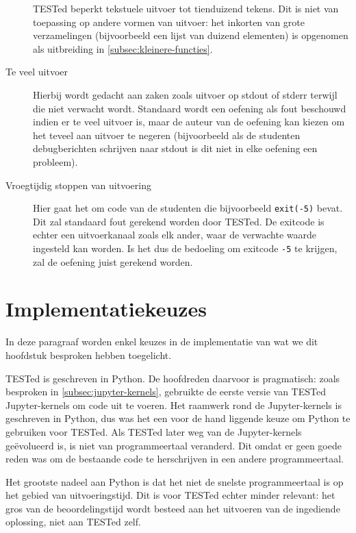 \begin{description}
    TESTed beperkt tekstuele uitvoer tot tienduizend tekens.
    Dit is niet van toepassing op andere vormen van uitvoer: het inkorten van grote verzamelingen (bijvoorbeeld een lijst van duizend elementen) is opgenomen als uitbreiding in \cref{subsec:kleinere-functies}.
    \item[Te veel uitvoer] Hierbij wordt gedacht aan zaken zoals uitvoer op stdout of stderr terwijl die niet verwacht wordt.
    Standaard wordt een oefening als fout beschouwd indien er te veel uitvoer is, maar de auteur van de oefening kan kiezen om het teveel aan uitvoer te negeren (bijvoorbeeld als de studenten debugberichten schrijven naar stdout is dit niet in elke oefening een probleem).
    \item[Vroegtijdig stoppen van uitvoering] Hier gaat het om code van de studenten die bijvoorbeeld \texttt{exit(-5)} bevat.
    Dit zal standaard fout gerekend worden door TESTed.
    De exitcode is echter een uitvoerkanaal zoals elk ander, waar de verwachte waarde ingesteld kan worden.
    Is het dus de bedoeling om exitcode \texttt{-5} te krijgen, zal de oefening juist gerekend worden.

\end{description}

\section{Implementatiekeuzes}\label{sec:technische-aspecten}

In deze paragraaf worden enkel keuzes in de implementatie van wat we dit hoofdstuk besproken hebben toegelicht.

TESTed is geschreven in Python.
De hoofdreden daarvoor is pragmatisch: zoals besproken in \cref{subsec:jupyter-kernels}, gebruikte de eerste versie van TESTed Jupyter-kernels om code uit te voeren.
Het raamwerk rond de Jupyter-kernels is geschreven in Python, dus was het een voor de hand liggende keuze om Python te gebruiken voor TESTed.
Als TESTed later weg van de Jupyter-kernels geëvolueerd is, is niet van programmeertaal veranderd.
Dit omdat er geen goede reden was om de bestaande code te herschrijven in een andere programmeertaal.

Het grootste nadeel aan Python is dat het niet de snelste programmeertaal is op het gebied van uitvoeringstijd.
Dit is voor TESTed echter minder relevant: het gros van de beoordelingstijd wordt besteed aan het uitvoeren van de ingediende oplossing, niet aan TESTed zelf.

